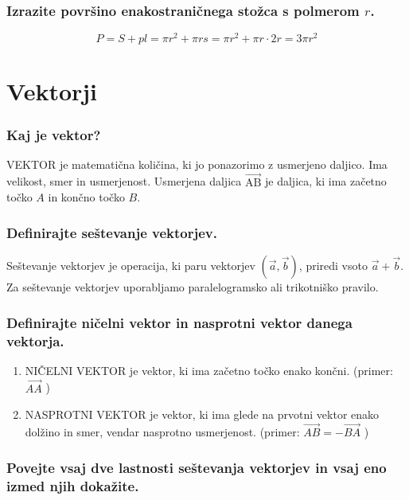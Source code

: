 \documentclass{article}
\begin{document}
\subsubsection*{Izrazite površino enakostraničnega stožca s polmerom $r$.}

$$
P=S+p l=\pi r^{2}+\pi r s=\pi r^{2}+\pi r \cdot 2 r=3 \pi r^{2}
$$

\section{Vektorji}
\subsubsection*{Kaj je vektor?}

VEKTOR je matematična količina, ki jo ponazorimo z usmerjeno daljico. Ima velikost, smer in usmerjenost. Usmerjena daljica $\overrightarrow{\mathrm{AB}}$ je daljica, ki ima začetno točko $A$ in končno točko $B$.

\subsubsection*{Definirajte seštevanje vektorjev.}

Seštevanje vektorjev je operacija, ki paru vektorjev $(\vec{a}, \vec{b})$, priredi vsoto $\vec{a}+\vec{b}$. Za seštevanje vektorjev uporabljamo paralelogramsko ali trikotniško pravilo.

\subsubsection*{Definirajte ničelni vektor in nasprotni vektor danega vektorja.}

\begin{enumerate}
    \item NIČELNI VEKTOR je vektor, ki ima začetno točko enako končni. (primer: $\overrightarrow{A A}$ )

  \item NASPROTNI VEKTOR je vektor, ki ima glede na prvotni vektor enako dolžino in smer, vendar nasprotno usmerjenost. (primer: $\overrightarrow{A B}=-\overrightarrow{B A}$ )
\end{enumerate}

\subsubsection*{Povejte vsaj dve lastnosti seštevanja vektorjev in vsaj eno izmed njih dokažite.}
\end{document}
